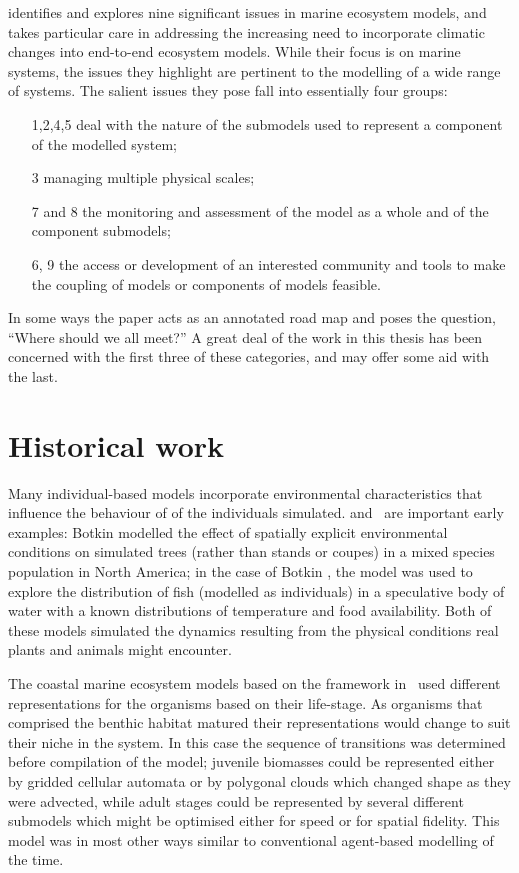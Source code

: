 \Cite{rose10:1} identifies and explores nine significant issues in
marine ecosystem models, and takes particular care in addressing the
increasing need to incorporate climatic changes into end-to-end
ecosystem models.  While their focus is on marine systems, the issues
they highlight are pertinent to the modelling of a wide range of
systems.  The salient issues they pose fall into essentially four groups:
\begin{itemize}
\item[1,2,4,5] deal with the nature of the submodels used to
represent a component of the modelled system;
\item[3] managing multiple physical scales;
\item[7 and 8] the monitoring and assessment of the model as a whole
and of the component submodels;
\item[6, 9] the access or development of an interested community and
tools to make the coupling of models or components of models feasible.
\end{itemize}
In some ways the paper acts as an annotated road map and poses the
question, ``Where should we all meet?''  A great deal of the work in
this thesis has been concerned with the first three of these
categories, and may offer some aid with the last.


\section{Historical work}

Many individual-based models incorporate environmental characteristics
that influence the behaviour of of the individuals
simulated.  and~\citet{deangelis1978model} are
important early examples: Botkin \etal modelled the effect of
spatially explicit environmental conditions on simulated trees (rather
than stands or coupes) in a mixed species population in
North America; in the case of Botkin \etal, the model was used to
explore the distribution of fish (modelled as individuals) in a
speculative body of water with a known distributions of temperature
and food availability. Both of these models simulated the 
dynamics resulting from the physical conditions real plants and
animals might encounter. 

The coastal marine ecosystem models based on the \InVitro framework
in~\cite{gray2006nws} used different representations for the organisms
based on their life-stage. As organisms that comprised the benthic
habitat matured their representations would change to suit their niche
in the system.  In this case the sequence of transitions was
determined before compilation of the model; juvenile biomasses could
be represented either by gridded cellular automata or by polygonal
clouds which changed shape as they were advected, while adult stages
could be represented by several different submodels which might be
optimised either for speed or for spatial fidelity.  This model was in
most other ways similar to conventional agent-based modelling of the
time.

